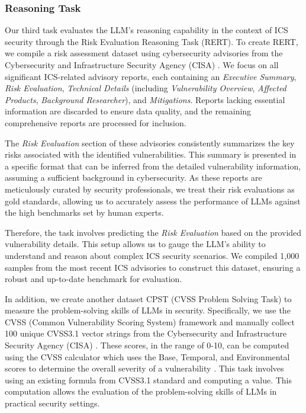 \documentclass[conference]{IEEEtran}
\begin{document}
\subsubsection{Reasoning Task}\label{sec:reasoningtask}
Our third task evaluates the LLM's reasoning capability in the context of ICS security through the Risk Evaluation Reasoning Task (RERT). To create RERT, we compile a risk assessment dataset using cybersecurity advisories from the Cybersecurity and Infrastructure Security Agency (CISA) \cite{cisa_advisories}. We focus on all significant ICS-related advisory reports, each containing an \textit{Executive Summary}, \textit{Risk Evaluation}, \textit{Technical Details} (including \textit{Vulnerability Overview}, \textit{Affected Products}, \textit{Background Researcher}), and \textit{Mitigations}. Reports lacking essential information are discarded to ensure data quality, and the remaining comprehensive reports are processed for inclusion.

The \textit{Risk Evaluation} section of these advisories consistently summarizes the key risks associated with the identified vulnerabilities. This summary is presented in a specific format that can be inferred from the detailed vulnerability information, assuming a sufficient background in cybersecurity. As these reports are meticulously curated by security professionals, we treat their risk evaluations as gold standards, allowing us to accurately assess the performance of LLMs against the high benchmarks set by human experts.

Therefore, the task involves predicting the \textit{Risk Evaluation} based on the provided vulnerability details. This setup allows us to gauge the LLM's ability to understand and reason about complex ICS security scenarios. We compiled 1,000 samples from the most recent ICS advisories to construct this dataset, ensuring a robust and up-to-date benchmark for evaluation.

In addition, we create another dataset CPST (CVSS Problem Solving Task) to measure the problem-solving skills of LLMs in security. Specifically, we use the CVSS (Common Vulnerability Scoring System) framework and manually collect 100 unique CVSS3.1 vector strings from the Cybersecurity and Infrastructure Security Agency (CISA) \cite{cisa_advisories}. These scores, in the range of 0-10, can be computed using the CVSS calculator which uses the Base, Temporal, and Environmental scores to determine the overall severity of a vulnerability \cite{cvss3}. This task involves using an existing formula from CVSS3.1 standard and computing a value. This computation allows the evaluation of the problem-solving skills of LLMs in practical security settings.
\end{document}
